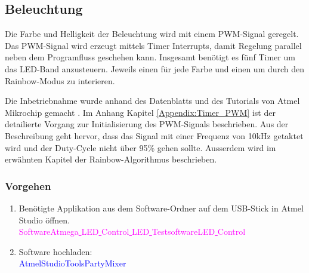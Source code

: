 \subsection{Beleuchtung}
\label{subsec:Inbetriebnahme_Beleuchtung}

Die Farbe und Helligkeit der Beleuchtung wird mit einem PWM-Signal geregelt. Das PWM-Signal wird erzeugt mittels Timer Interrupts, damit Regelung parallel neben dem Programfluss geschehen kann. Insgesamt benötigt es fünf Timer um das LED-Band anzusteuern. Jeweils einen für jede Farbe und einen um durch den Rainbow-Modus zu interieren.

Die Inbetriebnahme wurde anhand des Datenblatts und des Tutorials von Atmel Mikrochip gemacht \cite{mikrochip_makes_getting_2015}\cite{mikrochip_makes_getting_2015-1}\cite{mikrochip_makes_getting_2015-2}. Im Anhang Kapitel \ref{Appendix:Timer_PWM} ist der detailierte Vorgang zur Initialisierung des PWM-Signals beschrieben. Aus der Beschreibung geht hervor, dass das Signal mit einer Frequenz von 10kHz getaktet wird und der Duty-Cycle nicht über 95\% gehen sollte. Ausserdem wird im erwähnten Kapitel der Rainbow-Algorithmus beschrieben.



\subsubsection{Vorgehen}

\begin{enumerate}
\item Benötigte Applikation aus dem Software-Ordner auf dem USB-Stick in Atmel Studio öffnen.\\
\textcolor{magenta}{Software\textrightarrow Atmega\underline{ }LED\underline{ }Control\underline{ }LED\underline{ }Testsoftware\textrightarrow LED\underline{ }Control}\\

\item Software hochladen:\\
\textcolor{blue}{AtmelStudio\textrightarrow Tools\textrightarrow PartyMixer}\\

\end{enumerate}